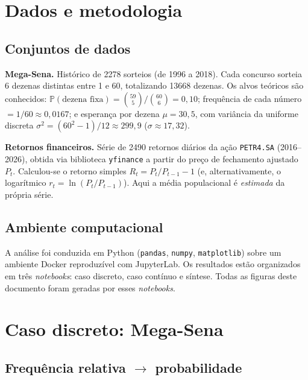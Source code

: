\documentclass[12pt,a4paper]{article}
\newcommand{\Prob}{\mathbb{P}}
\begin{document}
\section{Dados e metodologia}

\subsection{Conjuntos de dados}

\textbf{Mega-Sena.} Histórico de \num{2278} sorteios (de 1996 a 2018). Cada concurso
sorteia 6 dezenas distintas entre 1 e 60, totalizando \num{13668} dezenas. Os alvos
teóricos são conhecidos: $\Prob(\text{dezena fixa})=\binom{59}{5}/\binom{60}{6}=0{,}10$;
frequência de cada número $=1/60\approx0{,}0167$; e esperança por dezena $\mu=30{,}5$,
com variância da uniforme discreta $\sigma^2=(60^2-1)/12\approx299{,}9$
($\sigma\approx17{,}32$).

\textbf{Retornos financeiros.} Série de \num{2490} retornos diários da ação
\texttt{PETR4.SA} (2016--2026), obtida via biblioteca \texttt{yfinance} a partir do
preço de fechamento ajustado $P_t$. Calculou-se o retorno simples
$R_t = P_t/P_{t-1}-1$ (e, alternativamente, o logarítmico $r_t=\ln(P_t/P_{t-1})$).
Aqui a média populacional é \emph{estimada} da própria série.

\subsection{Ambiente computacional}

A análise foi conduzida em Python (\texttt{pandas}, \texttt{numpy},
\texttt{matplotlib}) sobre um ambiente Docker reproduzível com JupyterLab. Os
resultados estão organizados em três \emph{notebooks}: caso discreto, caso contínuo e
síntese. Todas as figuras deste documento foram geradas por esses \emph{notebooks}.

\section{Caso discreto: Mega-Sena}

\subsection{Frequência relativa \texorpdfstring{$\to$}{->} probabilidade}
\end{document}
